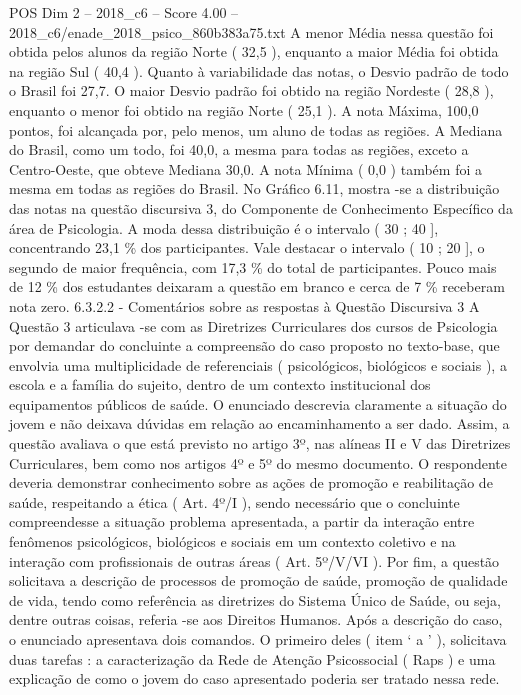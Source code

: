 \begin{textsample}{POS Dim 2 – 2018\_c6 – Score 4.00 – 2018\_c6/enade\_2018\_psico\_860b383a75.txt}
A menor Média nessa questão foi obtida pelos alunos da região Norte ( 32,5 ), enquanto a maior Média foi obtida na região Sul ( 40,4 ).
Quanto à variabilidade das notas, o Desvio padrão de todo o Brasil foi 27,7.
O maior Desvio padrão foi obtido na região Nordeste ( 28,8 ), enquanto o menor foi obtido na região Norte ( 25,1 ).
A nota Máxima, 100,0 pontos, foi alcançada por, pelo menos, um aluno de todas as regiões.
A Mediana do Brasil, como um todo, foi 40,0, a mesma para todas as regiões, exceto a Centro-Oeste, que obteve Mediana 30,0.
A nota Mínima ( 0,0 ) também foi a mesma em todas as regiões do Brasil.
No Gráfico 6.11, mostra -se a distribuição das notas na questão discursiva 3, do Componente de Conhecimento Específico da área de Psicologia.
A moda dessa distribuição é o intervalo ( 30 ; 40 ], concentrando 23,1 \% dos participantes.
Vale destacar o intervalo ( 10 ; 20 ], o segundo de maior frequência, com 17,3 \% do total de participantes.
Pouco mais de 12 \% dos estudantes deixaram a questão em branco e cerca de 7 \% receberam nota zero. 6.3.2.2 - Comentários sobre as respostas à Questão Discursiva 3 A Questão 3 articulava -se com as Diretrizes Curriculares dos cursos de Psicologia por demandar do concluinte a compreensão do caso proposto no texto-base, que envolvia uma multiplicidade de referenciais ( psicológicos, biológicos e sociais ), a escola e a família do sujeito, dentro de um contexto institucional dos equipamentos públicos de saúde.
O enunciado descrevia claramente a situação do jovem e não deixava dúvidas em relação ao encaminhamento a ser dado.
Assim, a questão avaliava o que está previsto no artigo 3º, nas alíneas II e V das Diretrizes Curriculares, bem como nos artigos 4º e 5º do mesmo documento.
O respondente deveria demonstrar conhecimento sobre as ações de promoção e reabilitação de saúde, respeitando a ética ( Art. 4º/I ), sendo necessário que o concluinte compreendesse a situação problema apresentada, a partir da interação entre fenômenos psicológicos, biológicos e sociais em um contexto coletivo e na interação com profissionais de outras áreas ( Art. 5º/V/VI ).
Por fim, a questão solicitava a descrição de processos de promoção de saúde, promoção de qualidade de vida, tendo como referência as diretrizes do Sistema Único de Saúde, ou seja, dentre outras coisas, referia -se aos Direitos Humanos.
Após a descrição do caso, o enunciado apresentava dois comandos.
O primeiro deles ( item ‘ a ’ ), solicitava duas tarefas : a caracterização da Rede de Atenção Psicossocial ( Raps ) e uma explicação de como o jovem do caso apresentado poderia ser tratado nessa rede.

\end{textsample}
